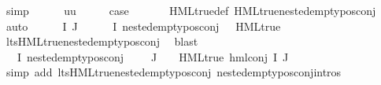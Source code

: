 \begin{isabellebody}
\ simp\isanewline
{}\isamarkupfalse%
\isanewline
\ \ \isamarkupfalse%
\ {\isacharparenleft}{\kern0pt}{}\ {\isasympsi}\ uu{\isacharparenright}{\kern0pt}\isanewline
\ \ \isamarkupfalse%
\ \isamarkupfalse%
\ {\isacharquery}{\kern0pt}case\ \isanewline
\ \ \ \ \isamarkupfalse%
\ HML{\isacharunderscore}{\kern0pt}true{\isacharunderscore}{\kern0pt}def\ HML{\isacharunderscore}{\kern0pt}true{\isacharunderscore}{\kern0pt}nested{\isacharunderscore}{\kern0pt}empty{\isacharunderscore}{\kern0pt}pos{\isacharunderscore}{\kern0pt}conj\ \isamarkupfalse%
\ auto\isanewline
{}\isamarkupfalse%
\isanewline
\ \ \isamarkupfalse%
\ {\isacharparenleft}{\kern0pt}{}\ {\isasymPhi}\ I\ J{\isacharparenright}{\kern0pt}\isanewline
\ \ \isamarkupfalse%
\ {\isachardoublequoteopen}{\isacharparenleft}{\kern0pt}{\isasymforall}{\isasympsi}{\isasymin}{\isasymPhi}\ {\isacharbackquote}{\kern0pt}\ I{\isachardot}{\kern0pt}\ nested{\isacharunderscore}{\kern0pt}empty{\isacharunderscore}{\kern0pt}pos{\isacharunderscore}{\kern0pt}conj\ {\isasympsi}\ {\isasymlongrightarrow}\ HML{\isacharunderscore}{\kern0pt}true\ {\isasympsi}{\isacharparenright}{\kern0pt}{\isachardoublequoteclose}\ \isanewline
\ \ \ \ \isamarkupfalse%
\ lts{\isachardot}{\kern0pt}HML{\isacharunderscore}{\kern0pt}true{\isacharunderscore}{\kern0pt}nested{\isacharunderscore}{\kern0pt}empty{\isacharunderscore}{\kern0pt}pos{\isacharunderscore}{\kern0pt}conj\ \isamarkupfalse%
\ blast\isanewline
\ \ \isamarkupfalse%
\ {\isachardoublequoteopen}{\isacharparenleft}{\kern0pt}{\isacharparenleft}{\kern0pt}{\isasymforall}{\isasympsi}{\isasymin}{\isasymPhi}\ {\isacharbackquote}{\kern0pt}\ I{\isachardot}{\kern0pt}\ nested{\isacharunderscore}{\kern0pt}empty{\isacharunderscore}{\kern0pt}pos{\isacharunderscore}{\kern0pt}conj\ {\isasympsi}{\isacharparenright}{\kern0pt}\ {\isasymand}\ {\isasymPhi}\ {\isacharbackquote}{\kern0pt}\ J\ {\isacharequal}{\kern0pt}\ {\isacharbraceleft}{\kern0pt}{\isacharbraceright}{\kern0pt}{\isacharparenright}{\kern0pt}\ {\isasymlongrightarrow}\ HML{\isacharunderscore}{\kern0pt}true\ {\isacharparenleft}{\kern0pt}hml{\isacharunderscore}{\kern0pt}conj\ I\ J\ {\isasymPhi}{\isacharparenright}{\kern0pt}{\isachardoublequoteclose}\isanewline
\ \ \ \ \isamarkupfalse%
\ {\isacharparenleft}{\kern0pt}simp\ add{\isacharcolon}{\kern0pt}\ lts{\isachardot}{\kern0pt}HML{\isacharunderscore}{\kern0pt}true{\isacharunderscore}{\kern0pt}nested{\isacharunderscore}{\kern0pt}empty{\isacharunderscore}{\kern0pt}pos{\isacharunderscore}{\kern0pt}conj\ nested{\isacharunderscore}{\kern0pt}empty{\isacharunderscore}{\kern0pt}pos{\isacharunderscore}{\kern0pt}conj{\isachardot}{\kern0pt}intros{\isacharparenleft}{\kern0pt}{}{\isacharparenright}{\kern0pt}{\isacharparenright}{\kern0pt}\isanewline

\end{isabellebody}
